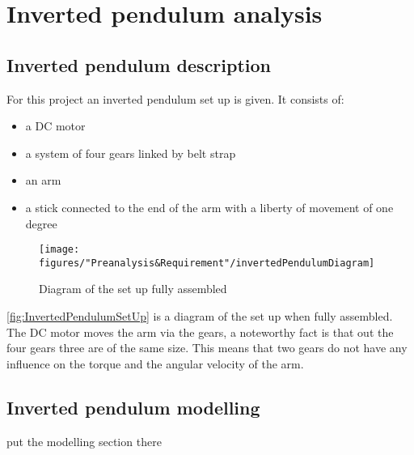 \chapter{Inverted pendulum analysis}


\section{Inverted pendulum description}
For this project an inverted pendulum set up is given. It consists of:
\begin{itemize}
	\item a DC motor
	\item a system of four gears linked by belt strap
	\item an arm
	\item a stick connected to the end of the arm with a liberty of movement of one degree
\end{itemize}

\begin{figure} [htbp]
	\centering
	\texttt{[image: figures/"Preanalysis\&Requirement"/invertedPendulumDiagram]}
	\caption{Diagram of the set up fully assembled} \label{fig:InvertedPendulumSetUp}
\end{figure}

\autoref{fig:InvertedPendulumSetUp} is a diagram of the set up when fully assembled. The DC motor moves the arm via the gears, a noteworthy fact is that out the four gears three are of the same size. This means that two gears do not have any influence on the torque and the angular velocity of the arm.

\section{Inverted pendulum modelling}
put the modelling section there


